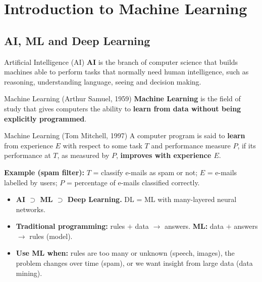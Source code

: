 \chapter{Introduction to Machine Learning}\label{n:intro}

\section{AI, ML and Deep Learning}

\begin{dfn}{Artificial Intelligence (AI)}
\textbf{AI} is the branch of computer science that builds machines able to perform tasks that normally need human intelligence, such as reasoning, understanding language, seeing and decision making.
\end{dfn}

\begin{dfn}{Machine Learning (Arthur Samuel, 1959)}
\textbf{Machine Learning} is the field of study that gives computers the ability to \textbf{learn from data without being explicitly programmed}.
\end{dfn}

\begin{dfn}{Machine Learning (Tom Mitchell, 1997)}
A computer program is said to \textbf{learn} from experience $E$ with respect to some task $T$ and performance measure $P$, if its performance at $T$, as measured by $P$, \textbf{improves with experience $E$}.
\end{dfn}

\textbf{Example (spam filter):} $T$ = classify e-mails as spam or not; $E$ = e-mails labelled by users; $P$ = percentage of e-mails classified correctly.

\begin{itemize}
  \item \textbf{AI $\supset$ ML $\supset$ Deep Learning.} DL = ML with many-layered neural networks.
  \item \textbf{Traditional programming:} rules $+$ data $\to$ answers. \textbf{ML:} data $+$ answers $\to$ rules (model).
  \item \textbf{Use ML when:} rules are too many or unknown (speech, images), the problem changes over time (spam), or we want insight from large data (data mining).
\end{itemize}

